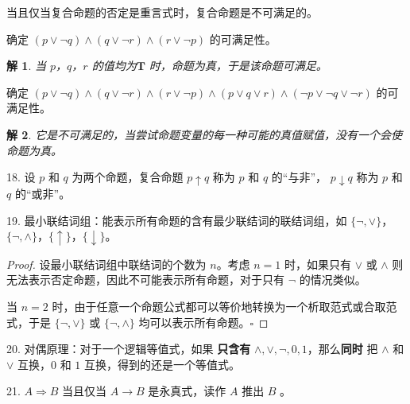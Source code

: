 \documentclass[normal,cyan]{elegantnote}
\newtheorem{solve}{解}
\newcommand{\QED}{\square}
\begin{document}
当且仅当复合命题的否定是重言式时，复合命题是不可满足的。
\begin{example}
    确定 $(p \vee \neg q) \wedge (q \vee \neg r) \wedge (r \vee \neg p)$ 的可满足性。
\end{example}
\begin{solve}
    当 $p$，$q$，$r$ 的值均为$\mathbf{T}$ 时，命题为真，于是该命题可满足。
\end{solve}
\begin{example}
    确定 $(p \vee \neg q) \wedge (q \vee \neg r) \wedge (r \vee \neg p) \wedge (p \vee q \vee r) \wedge (\neg p \vee \neg q \vee \neg r)$ 的可满足性。
\end{example}
\begin{solve}
    它是不可满足的，当尝试命题变量的每一种可能的真值赋值，没有一个会使命题为真。
\end{solve}
18. 设 $p$ 和 $q$ 为两个命题，复合命题 $p \uparrow q$ 称为 $p$ 和 $q$ 的“与非”， $p \downarrow q$ 称为 $p$ 和 $q$ 的“或非”。

19. 最小联结词组：能表示所有命题的含有最少联结词的联结词组，如 $\{\neg, \vee\}$，$\{\neg , \wedge\}$，$\{\uparrow\}$，$\{\downarrow\}$。
\begin{proof}
    设最小联结词组中联结词的个数为 $n$。考虑 $n = 1$ 时，如果只有 $\vee$ 或 $\wedge$ 则无法表示否定命题，因此不可能表示所有命题，对于只有 $\neg$ 的情况类似。

    当 $n = 2$ 时，由于任意一个命题公式都可以等价地转换为一个析取范式或合取范式，于是 $\{\neg, \vee\}$ 或 $\{\neg , \wedge\}$ 均可以表示所有命题。$\QED$
\end{proof}
20. 对偶原理：对于一个逻辑等值式，如果 \textbf{只含有} $\wedge, \vee, \neg, 0, 1$，那么\textbf{同时} 把 $\wedge$ 和 $\vee$ 互换，$0$ 和 $1$ 互换，得到的还是一个等值式。

21. $A \Longrightarrow B$ 当且仅当 $A\rightarrow B$ 是永真式，读作 $A$ 推出 $B$ 。
\end{document}
